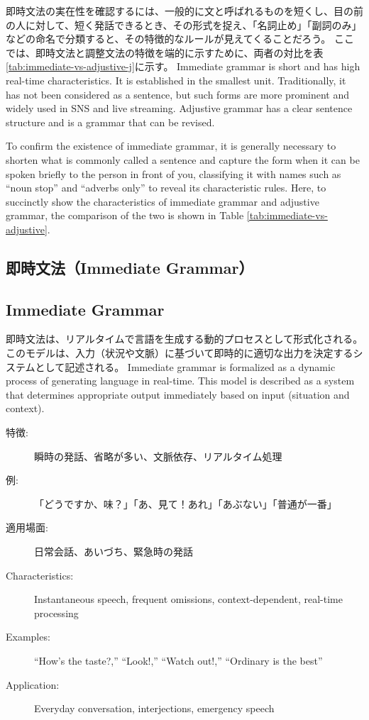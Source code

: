 \documentclass[a4paper,xelatex,ja=standard]{bxjsarticle}
\begin{document}
即時文法の実在性を確認するには、一般的に文と呼ばれるものを短くし、目の前の人に対して、短く発話できるとき、その形式を捉え、「名詞止め」「副詞のみ」などの命名で分類すると、その特徴的なルールが見えてくることだろう。
ここでは、即時文法と調整文法の特徴を端的に示すために、両者の対比を表\ref{tab:immediate-vs-adjustive-j}に示す。
\else
Immediate grammar is short and has high real-time characteristics. It is established in the smallest unit.
Traditionally, it has not been considered as a sentence, but such forms are more prominent and widely used in SNS and live streaming.
Adjustive grammar has a clear sentence structure and is a grammar that can be revised.

To confirm the existence of immediate grammar, it is generally necessary to shorten what is commonly called a sentence and capture the form when it can be spoken briefly to the person in front of you, classifying it with names such as ``noun stop'' and ``adverbs only'' to reveal its characteristic rules.
Here, to succinctly show the characteristics of immediate grammar and adjustive grammar, the comparison of the two is shown in Table \ref{tab:immediate-vs-adjustive}.
\fi

\ifJPN
  \subsection{即時文法（Immediate Grammar）}
\else
  \subsection{Immediate Grammar}
\fi

\ifJPN
即時文法は、リアルタイムで言語を生成する動的プロセスとして形式化される。このモデルは、入力（状況や文脈）に基づいて即時的に適切な出力を決定するシステムとして記述される。
\else
Immediate grammar is formalized as a dynamic process of generating language in real-time. This model is described as a system that determines appropriate output immediately based on input (situation and context).
\fi

\ifJPN
  \begin{description}
    \item[特徴:] 瞬時の発話、省略が多い、文脈依存、リアルタイム処理
    \item[例:] 「どうですか、味？」「あ、見て！あれ」「あぶない」「普通が一番」
    \item[適用場面:] 日常会話、あいづち、緊急時の発話
  \end{description}
\else
  \begin{description}
    \item[Characteristics:] Instantaneous speech, frequent omissions, context-dependent, real-time processing
    \item[Examples:] ``How's the taste?,'' ``Look!,'' ``Watch out!,'' ``Ordinary is the best''
    \item[Application:] Everyday conversation, interjections, emergency speech
  \end{description}
\fi
\end{document}
